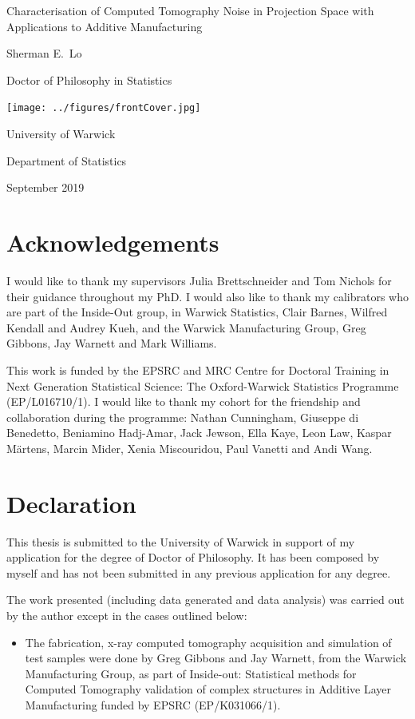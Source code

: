 \documentclass[12pt, a4paper]{memoir}
\begin{document}
\sloppy

\begin{titlingpage}
\centering
{\LARGE Characterisation of Computed Tomography Noise in Projection Space with Applications to Additive Manufacturing \par}
\vspace{1cm}
{\Large Sherman E.~Lo\par}
{\Large Doctor of Philosophy in Statistics\par}
\vfill
\texttt{[image: ../figures/frontCover.jpg]}
\vfill
{\Large University of Warwick\par}
{\Large Department of Statistics\par}
{\Large September 2019\par}
\end{titlingpage}


\frontmatter

\newpage
\tableofcontents*
\newpage
\listoffigures
\newpage
\listoftables

\chapter{Acknowledgements}
I would like to thank my supervisors Julia Brettschneider and Tom Nichols for their guidance throughout my PhD. I would also like to thank my calibrators who are part of the Inside-Out group, in Warwick Statistics, Clair Barnes, Wilfred Kendall and Audrey Kueh, and the Warwick Manufacturing Group, Greg Gibbons, Jay Warnett and Mark Williams.

This work is funded by the EPSRC and MRC Centre for Doctoral Training in Next Generation Statistical Science: The Oxford-Warwick Statistics Programme (EP/L016710/1). I would like to thank my cohort for the friendship and collaboration during the programme: Nathan Cunningham, Giuseppe di Benedetto, Beniamino Hadj-Amar, Jack Jewson, Ella Kaye, Leon Law, Kaspar M\"{a}rtens, Marcin Mider, Xenia Miscouridou, Paul Vanetti and Andi Wang.

\chapter{Declaration}
This thesis is submitted to the University of Warwick in support of my application for the degree of Doctor of Philosophy. It has been composed by myself and has not been submitted in any previous application for any degree.

The work presented (including data generated and data analysis) was carried out by the author except in the cases outlined below:
\begin{itemize}
  \item The fabrication, x-ray computed tomography acquisition and simulation of test samples were done by Greg Gibbons and Jay Warnett, from the Warwick Manufacturing Group, as part of Inside-out: Statistical methods for Computed Tomography validation of complex structures in Additive Layer Manufacturing funded by EPSRC (EP/K031066/1).
\end{itemize}
\end{document}
